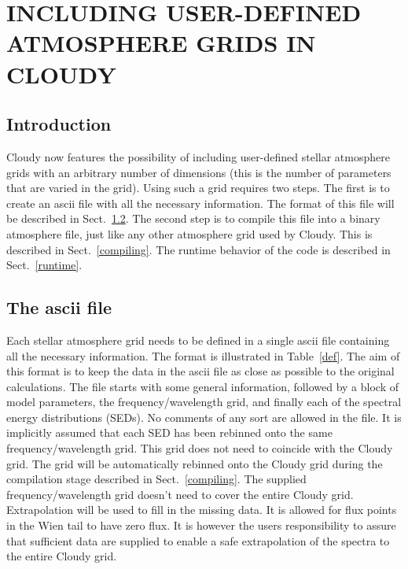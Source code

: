 \chapter{INCLUDING USER-DEFINED ATMOSPHERE GRIDS IN CLOUDY}

\section{Introduction}

Cloudy now features the possibility of including user-defined stellar
atmosphere grids with an arbitrary number of dimensions (this is the number of
parameters that are varied in the grid). Using such a grid requires two steps.
The first is to create an ascii file with all the necessary information. The
format of this file will be described in Sect.~\ref{ascii}. The second step
is to compile this file into a binary atmosphere file, just like any other
atmosphere grid used by Cloudy. This is described in Sect.~\ref{compiling}.
The runtime behavior of the code is described in Sect.~\ref{runtime}.

\section{The ascii file}
\label{ascii}

Each stellar atmosphere grid needs to be defined in a single ascii file
containing all the necessary information. The format is illustrated in
Table~\ref{def}. The aim of this format is to keep the data in the ascii file
as close as possible to the original calculations. The file starts with some
general information, followed by a block of model parameters, the
frequency/wavelength grid, and finally each of the spectral energy
distributions (SEDs). No comments of any sort are allowed in the file. It is
implicitly assumed that each SED has been rebinned onto the same
frequency/wavelength grid. This grid does not need to coincide with the Cloudy
grid. The grid will be automatically rebinned onto the Cloudy grid during the
compilation stage described in Sect.~\ref{compiling}. The supplied
frequency/wavelength grid doesn't need to cover the entire Cloudy grid.
Extrapolation will be used to fill in the missing data. It is allowed for flux
points in the Wien tail to have zero flux. It is however the users
responsibility to assure that sufficient data are supplied to enable a safe
extrapolation of the spectra to the entire Cloudy grid.

